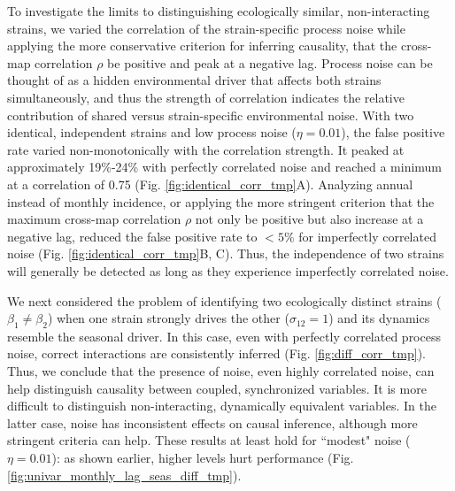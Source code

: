 \documentclass[10pt]{article}
\begin{document}
To investigate the limits to distinguishing ecologically similar, non-interacting strains, we varied the correlation of the strain-specific process noise while applying the more conservative criterion for inferring causality, that the cross-map correlation $\rho$ be positive and peak at a negative lag.
Process noise can be thought of as a hidden environmental driver that affects both strains simultaneously, and thus the strength of correlation indicates the relative contribution of shared versus strain-specific environmental noise.  
With two identical, independent strains and low process noise ($\eta=0.01$), the false positive rate varied non-monotonically with the correlation strength.
It peaked at approximately 19\%-24\% with perfectly correlated noise and reached a minimum at a correlation of 0.75 (Fig. \ref{fig:identical_corr_tmp}A).
Analyzing annual instead of monthly incidence, or applying the more stringent criterion that the maximum cross-map correlation $\rho$ not only be positive but also increase at a negative lag, reduced the false positive rate to $<5\%$ for imperfectly correlated noise (Fig. \ref{fig:identical_corr_tmp}B, C).
Thus, the independence of two strains will generally be detected as long as they experience imperfectly correlated noise. 

We next considered the problem of identifying two ecologically distinct strains ($\beta_1 \neq \beta_2$) when one strain strongly drives the other ($\sigma_{12}=1$) and its dynamics resemble the seasonal driver.
In this case, even with perfectly correlated process noise, correct interactions are consistently inferred (Fig. \ref{fig:diff_corr_tmp}).
Thus, we conclude that the presence of noise, even highly correlated noise, can help distinguish causality between coupled, synchronized variables.
It is more difficult to distinguish non-interacting, dynamically equivalent variables.
In the latter case, noise has inconsistent effects on causal inference, although more stringent criteria can help.
These results at least hold for ``modest" noise ($\eta=0.01$): as shown earlier, higher levels hurt performance (Fig. \ref{fig:univar_monthly_lag_seas_diff_tmp}).
\end{document}

